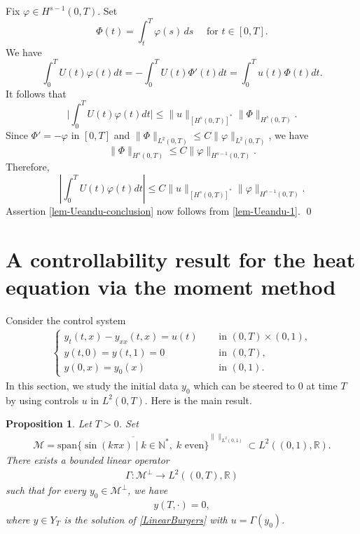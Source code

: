 \documentclass[11pt, reqno]{amsart}
\theoremstyle{plain}
\newtheorem{proposition}[thm]{Proposition}
\numberwithin{equation}{section}
\newcommand{\mR}{\mathbb{R}}
\begin{document}
Fix $\varphi \in H^{s - 1}(0, T)$.  Set 
$$
\Phi (t) = \int_t^T \varphi(s) \, ds \quad \text{ for } t \in [0, T]. 
$$
We have 
$$
\int_0^T U(t) \varphi(t) dt  = - \int_0^T U(t) \Phi'(t) dt = \int_0^T u(t) \Phi(t) dt. 
$$
It follows that 
$$
\Big| \int_0^T U(t) \varphi(t) dt \Big| \le \| u \|_{[H^{s}(0, T)]^*} \| \Phi \|_{H^{s}(0, T)}. 
$$
Since $\Phi' = - \varphi$ in $[0, T]$ and $\|\Phi\|_{L^2(0, T)} \le C \| \varphi \|_{L^2(0, T)}$, we have
$$
\| \Phi \|_{H^{s}(0, T)} \le C \| \varphi\|_{H^{s-1}(0, T)}. 
$$
Therefore,
$$
	\left| \int_0^T U(t) \varphi(t) dt \right| \leq C \|u \|_{[H^s(0, T)]^*} \| \varphi \|_{H^{s - 1}(0, T)}.
$$
Assertion \eqref{lem-Ueandu-conclusion} now follows from \eqref{lem-Ueandu-1}. \qed

\section{A controllability result for the heat equation via the moment method} \label{sect-moment}

Consider the control system 
\begin{align} 	\label{LinearBurgers}
\begin{cases}  
	y_t(t,x) - y_{xx}(t,x) = u(t) 	\quad &\text{ in } (0, T) \times (0, 1), \\[6pt]
	y(t, 0) = y(t, 1) = 0 &\text{ in } (0, T), \\[6pt]
	y(0, x) = y_0(x) &\text{ in } (0, 1).
\end{cases}
\end{align}
In this section, we study the initial data $y_0$ which can be steered to $0$ at time $T$ by using controls $u$ in $L^2(0, T)$.  Here is the main result.  

\begin{proposition}	\label{pro-heat-moment} 
Let $T > 0$.  Set 
\begin{align*}
    \mathscr{M} = \overline{\mathrm{span} \{\sin (k \pi x) \; | \;k \in \mathbb{N}^*, \; k \text{ even} \}}^{\| \|_{L^2(0, 1)}} \subset L^2((0, 1), \mR).
\end{align*}
There exists a bounded linear operator 
	\begin{align*}	
	\Gamma: \mathscr{M}^{\bot} \longrightarrow L^2((0, T), \mR)
	\end{align*}
	 such that for every $y_0 \in \mathscr{M}^{\bot}$, we have
	 \begin{align*}
	 	y(T, \cdot) = 0,
	\end{align*}	  
	 where $y \in Y_T$ is the solution of \eqref{LinearBurgers} with $u = \Gamma(y_0)$.
\end{proposition}
\end{document}
